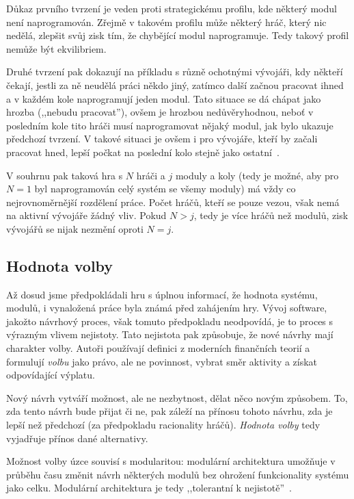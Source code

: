 \begin{multicols}{2}
		Důkaz prvního tvrzení je veden proti strategickému profilu, kde některý modul není naprogramován. Zřejmě v takovém profilu může některý hráč, který nic nedělá, zlepšit svůj zisk tím, že chybějící modul naprogramuje. Tedy takový profil nemůže být ekvilibriem.

		Druhé tvrzení pak dokazují na příkladu s různě ochotnými vývojáři, kdy někteří čekají, jestli za ně neudělá práci někdo jiný, zatímco další začnou pracovat ihned a v každém kole naprogramují jeden modul. Tato situace se dá chápat jako hrozba (,,nebudu pracovat''), ovšem je hrozbou nedůvěryhodnou, neboť v posledním kole tito hráči musí naprogramovat nějaký modul, jak bylo ukazuje předchozí tvrzení. V takové situaci je ovšem i pro vývojáře, kteří by začali pracovat hned, lepší počkat na poslední kolo stejně jako ostatní~\cite[kap. 4.1]{architecture-opensource}.

		V souhrnu pak taková hra s $N$ hráči a $j$ moduly a koly (tedy je možné, aby pro $N =1$ byl naprogramován celý systém se všemy moduly) má vždy co nejrovnoměrnější rozdělení práce. Počet hráčů, kteří se pouze vezou, však nemá na aktivní vývojáře žádný vliv. Pokud $N > j$, tedy je více hráčů než modulů, zisk vývojářů se nijak nezmění oproti $N = j$.

	\subsection*{Hodnota volby}
		Až dosud jsme předpokládali hru s úplnou informací, že hodnota systému, modulů, i vynaložená práce byla známá před zahájením hry. Vývoj software, jakožto návrhový proces, však tomuto předpokladu neodpovídá, je to proces s výrazným vlivem nejistoty. Tato nejistota pak způsobuje, že nové návrhy mají charakter volby. Autoři používají definici z moderních finančních teorií a formulují {\em volbu} jako právo, ale ne povinnost, vybrat směr aktivity a získat odpovídající výplatu.

		Nový návrh vytváří možnost, ale ne nezbytnost, dělat něco novým způsobem. To, zda tento návrh bude přijat či ne, pak záleží na přínosu tohoto návrhu, zda je lepší než předchozí (za předpokladu racionality hráčů). {\em Hodnota volby} tedy vyjadřuje přínos dané alternativy.

		Možnost volby úzce souvisí s modularitou: modulární architektura umožňuje v průběhu času změnit návrh některých modulů bez ohrožení funkcionality systému jako celku. Modulární architektura je tedy ,,tolerantní k nejistotě''~\cite[kap. 2.2]{architecture-opensource}.


\end{multicols}
